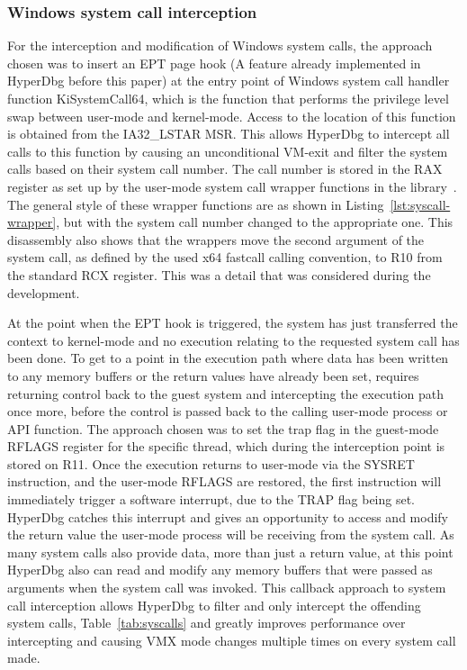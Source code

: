 \subsubsection{Windows system call interception}\label{syscall_interception}
For the interception and modification of Windows system calls, the approach chosen was to insert an EPT page hook (A feature already implemented in HyperDbg before this paper) 
at the entry point of Windows system call handler function KiSystemCall64, which is the function that performs the privilege level swap between user-mode and kernel-mode. 
Access to the location of this function is obtained from the IA32\_LSTAR MSR. 
This allows HyperDbg to intercept all calls to this function by causing an unconditional VM-exit and filter the system calls based on their system call number. 
The call number is stored in the RAX register as set up by the user-mode system call wrapper functions in the  library~\cite{ntdll-lib}. The general style of these 
wrapper functions are as shown in Listing~\ref{lst:syscall-wrapper}, but with the system call number changed to the appropriate one.
This disassembly also shows that the wrappers move the second argument of the system call, as defined by the used x64 fastcall calling convention, 
to R10 from the standard RCX register. This was a detail that was considered during the development.

At the point when the EPT hook is triggered, the system has just transferred the context to kernel-mode and no execution relating to the requested system call has been done. 
To get to a point in the execution path where data has been written to any memory buffers or the return values have already been set, 
requires returning control back to the guest system and intercepting the execution path once more, before the control is passed back to the calling user-mode process or API function. 
The approach chosen was to set the trap flag in the guest-mode RFLAGS register for the specific thread, which during the interception point is stored on R11. 
Once the execution returns to user-mode via the SYSRET instruction, and the user-mode RFLAGS are restored, the first instruction will immediately trigger a software interrupt, due to the TRAP flag
being set. HyperDbg catches this interrupt and gives an opportunity to access and modify the return value the user-mode process will be receiving from the system call. 
As many system calls also provide data, more than just a return value, at this point HyperDbg also can read and modify any memory buffers that were 
passed as arguments when the system call was invoked. This callback approach to system call interception allows HyperDbg to filter and only intercept 
the offending system calls, Table~\ref{tab:syscalls} and greatly improves performance over intercepting and causing VMX mode changes multiple times on every system call made.

